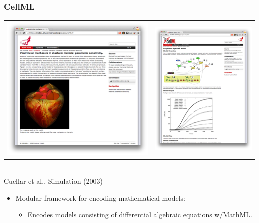 \documentclass{beamer}
\begin{document}
\begin{frame}\frametitle{CellML}
\begin{center}
\begin{tabular}{cc}
\includegraphics[height=0.3\textheight]{figs/CellML1} &
\includegraphics[height=0.3\textheight]{figs/CellML2} 
\end{tabular}\\
Cuellar et al., Simulation (2003)
\end{center}
\begin{itemize}
\item Modular framework for encoding mathematical models:
\begin{itemize}
\item Encodes models consisting of differential algebraic equations w/MathML.

\end{itemize}
\end{itemize}
\end{frame}
\end{document}
